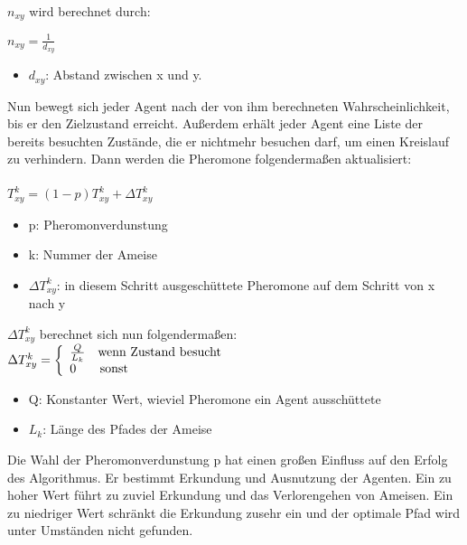 $n_{xy}$ wird berechnet durch:\\ 
\begin{large}
  $n_{xy}=\frac{1}{d_{xy}}$
\end{large}

\begin{itemize}
  \item $d_{xy}$: Abstand zwischen x und y.
\end{itemize}

Nun bewegt sich jeder Agent nach der von ihm berechneten Wahrscheinlichkeit, bis er den Zielzustand erreicht. Außerdem erhält jeder Agent eine Liste der bereits besuchten Zustände, die er nichtmehr besuchen darf, um einen Kreislauf zu verhindern. Dann werden die Pheromone folgendermaßen aktualisiert:\\\\\large
$T_{xy}^k=(1-p)T_{xy}^k+\Delta T_{xy}^k$\normalsize
\begin{itemize}
  \item p: Pheromonverdunstung
  \item k: Nummer der Ameise
  \item $\Delta T_{xy}^k$: in diesem Schritt ausgeschüttete Pheromone auf dem Schritt von x nach y
\end{itemize}
$\Delta T_{xy}^k$ berechnet sich nun folgendermaßen:\\
\large
$\Delta T_{xy}^k = \left\{
\begin{array}{ll}
\frac{Q}{L_k} & \normalsize \textrm{wenn Zustand besucht} \\
0 & \, \normalsize\textrm{sonst} \\
\end{array}
\right. $
\normalsize
\begin{itemize}
    \item Q: Konstanter Wert, wieviel Pheromone ein Agent ausschüttete
    \item $L_k$: Länge des Pfades der Ameise
\end{itemize}

Die Wahl der Pheromonverdunstung p hat einen großen Einfluss auf den Erfolg des Algorithmus. Er bestimmt Erkundung und Ausnutzung der Agenten. Ein zu hoher Wert führt zu zuviel Erkundung und das Verlorengehen von Ameisen. Ein zu niedriger Wert schränkt die Erkundung zusehr ein und der optimale Pfad wird unter Umständen nicht gefunden.\\
